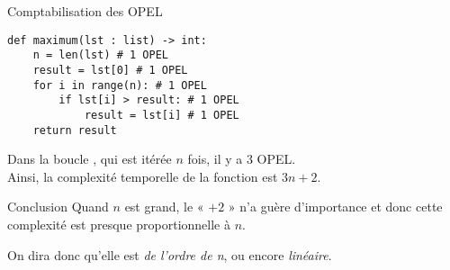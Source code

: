 \documentclass[12pt]{beamer}
\begin{document}
\begin{frame}[fragile]{Comptabilisation des \textsc{OPEL}}
\begin{verbatim}
def maximum(lst : list) -> int:
    n = len(lst) # 1 OPEL
    result = lst[0] # 1 OPEL
    for i in range(n): # 1 OPEL
        if lst[i] > result: # 1 OPEL
            result = lst[i] # 1 OPEL
    return result
\end{verbatim}
\pause
Dans la boucle , qui est itérée $n$ fois, il y a 3 \textsc{OPEL}.\\\pause
Ainsi, la complexité temporelle de la fonction est $3n + 2$.\\
\end{frame}

\begin{frame}{Conclusion}
Quand $n$ est grand, le « $+2$ » n'a guère d'importance et donc cette complexité est presque proportionnelle à $n$.\\\pause 

On dira donc qu'elle est \textit{de l'ordre de n}, ou encore \textit{linéaire}.
\end{frame}
\end{document}
